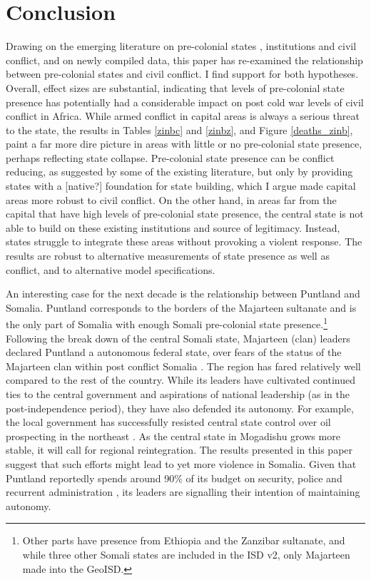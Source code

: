 \section{Conclusion} \label{Conclusion}

Drawing on the emerging literature on pre-colonial states \citep{Paine2019,
Depetris-Chauvin2016}, institutions \citep{Wig2016, Englebert2002,
Michalopoulos2018} and civil conflict, and on newly compiled data, this paper
has re-examined the relationship between pre-colonial states and civil conflict.
I find support for both hypotheses. Overall, effect sizes are substantial,
indicating that levels of pre-colonial state presence has potentially had a
considerable impact on post cold war levels of civil conflict in Africa. While
armed conflict in capital areas is always a serious threat to the state, the
results in Tables \ref{zinbc} and \ref{zinbz}, and Figure \ref{deaths_zinb},
paint a far more dire picture in areas with little or no pre-colonial state
presence, perhaps reflecting state collapse. Pre-colonial state presence can be
conflict reducing, as suggested by some of the existing literature, but only by
providing states with a [native?] foundation for state building, which I argue made
capital areas more robust to civil conflict. On the other hand, in areas far
from the capital that have high levels of pre-colonial state presence, the
central state is not able to build on these existing institutions and source of
legitimacy. Instead, states struggle to integrate these areas without provoking
a violent response. The results are robust to alternative measurements of state
presence as well as conflict, and to alternative model specifications.

An interesting case for the next decade is the relationship between Puntland and
Somalia. Puntland corresponds to the borders of the Majarteen sultanate and is
the only part of Somalia with enough Somali pre-colonial state
presence.\footnote{Other parts have presence from Ethiopia and the Zanzibar
sultanate, and while three other Somali states are included in the ISD v2, only
Majarteen made into the GeoISD.} Following the break down of the central
Somali state, Majarteen (clan) leaders declared Puntland a autonomous federal
state, over fears of the status of the Majarteen clan within post conflict
Somalia \citep{Johnson_2014}. The region has fared relatively well compared to the
rest of the country. While its leaders have cultivated continued ties to the
central government and aspirations of national leadership (as in the
post-independence period), they have also defended its autonomy. For example,
the local government has successfully resisted central state control over oil
prospecting in the northeast \citep{Johnson_2014}. As the central state in
Mogadishu grows more stable, it will call for regional reintegration. The
results presented in this paper suggest that such efforts might lead to yet more
violence in Somalia. Given that Puntland reportedly spends around 90\% of its
budget on security, police and recurrent administration \citep{Johnson_2014},
its leaders are signalling their intention of maintaining autonomy.

